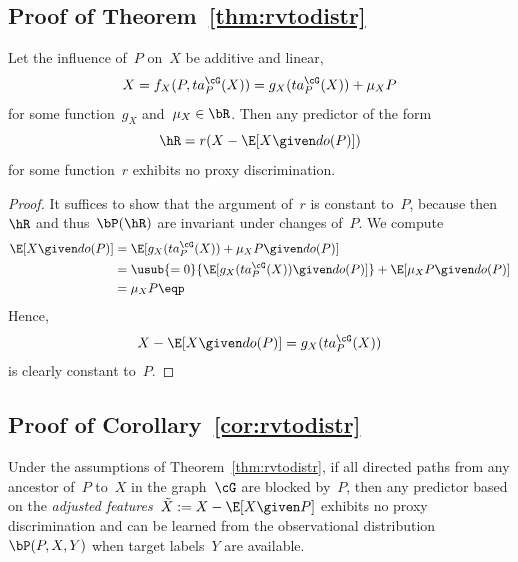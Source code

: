\subsection*{Proof of Theorem~\ref{thm:rvtodistr}}

\begin{theorem*}
  Let the influence of~$P$ on~$X$ be additive and linear, \ie{}
  \begin{equation*}
    X = f_X (P, ta^{\cG}_P(X)) = g_X(ta^{\cG}_P(X)) + \mu_X P
  \end{equation*}
  for some function~$g_X$ and~$\mu_X \in \bR$. Then any predictor of the form
  \begin{equation*}
    \hR = r(X - \E [X \given do(P)])
  \end{equation*}
  for some function~$r$ exhibits no proxy discrimination.
\end{theorem*}

\begin{proof}
  It suffices to show that the argument of~$r$ is constant \wrt{} to~$P$,
  because then~$\hR$ and thus~$\bP(\hR)$ are invariant under changes of~$P$. We
  compute
  \begin{align*}
    \E[X \given do(P)] &= \E[ g_X(ta^{\cG}_P (X)) + \mu_X P \given do(P)] \\
    &= \usub{=0}{\E[ g_X(ta^{\cG}_P (X)) \given do(P)]} + \E[\mu_X P \given do(P)]\\
    &= \mu_X P \eqp
  \end{align*}
  Hence,
  \begin{equation*}
    X - \E[X \given do(P)] = g_X(ta^{\cG}_P (X))
  \end{equation*}
  is clearly constant \wrt{} to~$P$.\qedhere
\end{proof}

\subsection*{Proof of Corollary~\ref{cor:rvtodistr}}

\begin{corollary*}
  Under the assumptions of Theorem~\ref{thm:rvtodistr}, if all directed paths
  from any ancestor of~$P$ to~$X$ in the graph~$\cG$ are blocked by~$P$, then
  any predictor based on the \emph{adjusted features}~$\tilde{X} := X - \E[X
  \given P]$ exhibits no proxy discrimination and can be learned from the
  observational distribution~$\bP(P, X, Y)$ when target labels~$Y$ are
  available.
\end{corollary*}

